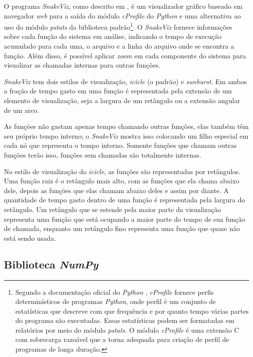 \documentclass[12pt]{article}
\begin{document}
O programa \textit{SnakeViz}, como descrito em \cite{SnakeViz:2022}, é um visualizador gráfico baseado em navegador \textit{web} para a saída do módulo \textit{cProfile} do \textit{Python} e uma alternativa ao uso do módulo \textit{pstats} da biblioteca padrão\footnote{Segundo a documentação oficial do \textit{Python} \cite{python:2022}, \textit{cProfile} fornece perfis determinísticos de programas \textit{Python}, onde perfil é um conjunto de estatísticas que descreve com que frequência e por quanto tempo várias partes do programa são executadas. Essas estatísticas podem ser formatadas em relatórios por meio do módulo \textit{pstats}. O módulo \textit{cProfile} é uma extensão C com sobrecarga razoável que a torna adequada para criação de perfil de programas de longa duração.}. O \textit{SnakeViz} fornece informações sobre cada função do sistema em análise, indicando o tempo de execução acumulado para cada uma, o arquivo e a linha do arquivo onde se encontra a função. Além disso, é possível aplicar \textit{zoom} em cada componente do sistema para visualizar as chamadas internas para outras funções.

\textit{SnakeViz} tem dois estilos de visualização, \textit{icicle} (o padrão) e \textit{sunburst}. Em ambos a fração de tempo gasto em uma função é representada pela extensão de um elemento de visualização, seja a largura de um retângulo ou a extensão angular de um arco.

As funções não gastam apenas tempo chamando outras funções, elas também têm seu próprio tempo interno; o \textit{SnakeViz} mostra isso colocando um filho especial em cada nó que representa o tempo interno. Somente funções que chamam outras funções terão isso, funções sem chamadas são totalmente internas.

No estilo de visualização do \textit{icicle}, as funções são representadas por retângulos. Uma função raiz é o retângulo mais alto, com as funções que ela chama abaixo dele, depois as funções que elas chamam abaixo deles e assim por diante. A quantidade de tempo gasto dentro de uma função é representada pela largura do retângulo. Um retângulo que se estende pela maior parte da visualização representa uma função que está ocupando a maior parte do tempo de sua função de chamada, enquanto um retângulo fino representa uma função que quase não está sendo usada.
 
\subsection{Biblioteca \textit{NumPy}}
\end{document}
